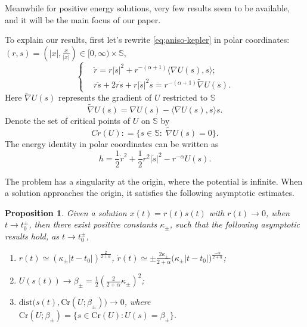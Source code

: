 \documentclass[11pt]{amsart}
\newcommand{\bs}{\mathbb S}
\newcommand{\al}{\alpha}
\newcommand{\bt}{\beta}
\newcommand{\kp}{\kappa}
\newcommand{\ey}{\frac{1}{2}}
\newcommand{\tnb}{\tilde{\nabla}}
\theoremstyle{plain}
\newtheorem{prop}{Proposition}[section]
\theoremstyle{definition}
\theoremstyle{remark}
\begin{document}
 Meanwhile for positive energy solutions, very few results seem to be available, and it will be the main focus of our paper. 


To explain our results, first let's rewrite \eqref{eq;aniso-kepler} in polar coordinates: $(r, s) = (|x|, \frac{x}{|x|}) \in [0, \infty) \times \bs,$ 
\begin{equation}
\label{eq;aniso-keper-polar} \begin{cases}
& \ddot{r} = r|\dot{s}|^2 + r^{-(\al +1)} \langle \nabla U(s), s \rangle; \\
& r \ddot{s} + 2\dot{r} \dot{s} + r|\dot{s}|^2 s = r^{-(\al +1)} \tnb U(s).
\end{cases} 
\end{equation}
Here $\tnb U(s)$ represents the gradient of $U$ restricted to $\bs$  
\begin{equation}
\label{eq;til-nb} \tnb U(s) = \nabla U(s) - \langle \nabla U(s), s \rangle s. 
\end{equation}
Denote the set of critical points of $U$ on $\bs$ by
$$  Cr(U): = \{s \in \bs: \; \tilde{\nabla} U(s)=0 \}. $$ 
The energy identity in polar coordinates can be written as 
\begin{equation}
\label{eq;energy-polar} h = \ey \dot{r}^2 + \ey r^2 |\dot{s}|^2 - r^{-\al} U(s). 
\end{equation}

The problem has a singularity at the origin, where the potential is infinite. When a solution approaches the origin, it satisfies the following asymptotic estimates.  
\begin{prop}{\cite[Section 4]{BFT08}}
\label{prop;Sundman-est} Given a solution $x(t) =r(t) s(t)$ with $r(t) \to 0$, when $t \to t_0^{\pm}$, then there exist positive constants $\kp_{\pm}$, such that the following asymptotic results hold, as $t \to t_0^{\pm}$,
\begin{enumerate}
\item[(a).] $r(t) \simeq (\kp_{\pm} |t-t_0|)^{\frac{2}{2+\al}}$, $\dot{r}(t) \simeq \pm \frac{2\kp_{\pm}}{2 +\al}\big( \kp_{\pm} |t-t_0| \big)^{\frac{-\al}{2+\al}}$;
\item[(b).] $U(s(t)) \to \bt_{\pm} = \ey \left( \frac{2}{2 +\al} \kp_{\pm} \right)^2$;
\item[(c).] $\text{dist}\big(s(t), \text{Cr}(U;\bt_{\pm}) \big) \to 0$, where $\text{Cr}(U; \bt_{\pm}) = \{s \in \text{Cr}(U): U(s) = \bt_{\pm} \}$. 
\end{enumerate}
\end{prop}
\end{document}
